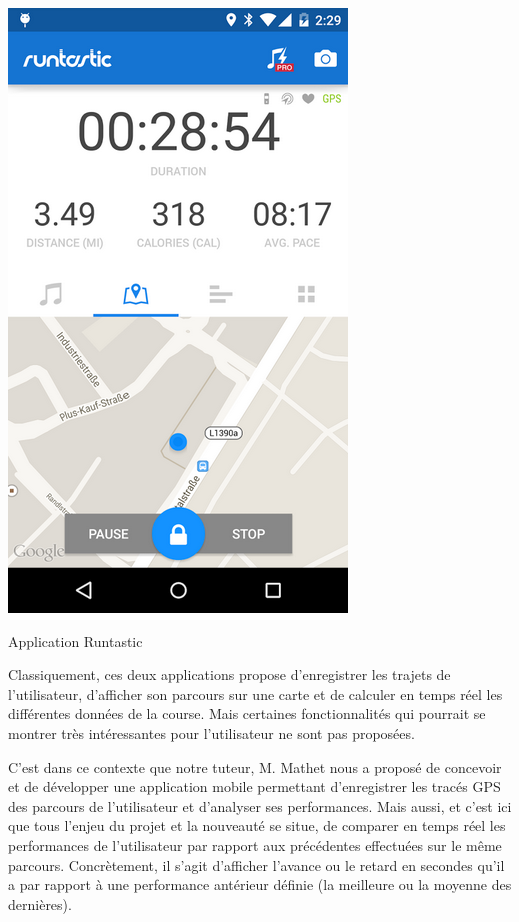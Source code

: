 \begin{multicols}{2}
\begin{img}
  \includegraphics[scale=0.9]{img/Runtastic.png}
  \caption{Application Runtastic}
\end{img}
\end{multicols}

Classiquement, ces deux applications propose d'enregistrer les trajets de l'utilisateur, d'afficher son parcours sur une carte et de calculer en temps réel les différentes données de la course. Mais certaines fonctionnalités qui pourrait se montrer très intéressantes pour l'utilisateur ne sont pas proposées.\bigskip

C'est dans ce contexte que notre tuteur, M. Mathet nous a proposé de concevoir et de développer une application mobile permettant d'enregistrer les tracés GPS des parcours de l'utilisateur et d'analyser ses performances. Mais aussi, et c'est ici que tous l'enjeu du projet et la nouveauté se situe, de comparer en temps réel les performances de l'utilisateur par rapport aux  précédentes effectuées sur le même parcours. Concrètement, il s'agit d'afficher l'avance ou le retard en secondes qu'il a par rapport à une performance antérieur définie (la meilleure ou la moyenne des dernières). 
